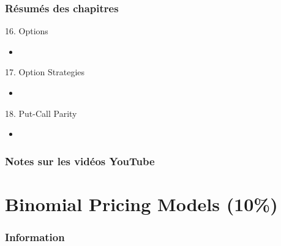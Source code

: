 \documentclass[12pt, titlepage, french]{report}
\begin{document}
\subsection{Résumés des chapitres}

\begin{CHPT_SUMM_AUTO}[label = {L.-16}]{16. Options}
	\begin{itemize}
		\item	
	\end{itemize}
\end{CHPT_SUMM_AUTO}

\begin{CHPT_SUMM_AUTO}[label = {L.-17}]{17. Option Strategies}
	\begin{itemize}
		\item	
	\end{itemize}
\end{CHPT_SUMM_AUTO}

\begin{CHPT_SUMM_AUTO}[label = {L.-18}]{18. Put-Call Parity}
	\begin{itemize}
		\item	
	\end{itemize}
\end{CHPT_SUMM_AUTO}

\subsection{Notes sur les vidéos YouTube}


\newpage

\chapter[Binomial Pricing Models]{Binomial Pricing Models (10\%)}

\subsection{Information}

\begin{distributions}[Objective]

\end{distributions}
\end{document}
